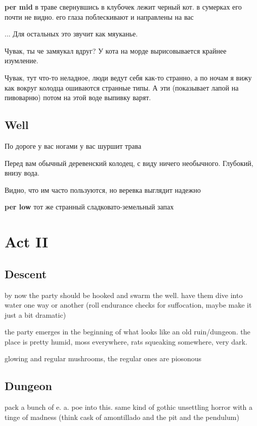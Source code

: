 \documentclass[a5paper,11pt]{book}
\begin{document}
\begin{multicols}{2}
\begin{boxed}
  \textbf{per mid} в траве свернувшись в клубочек лежит черный кот. в сумерках его почти не видно. его глаза поблескивают и направлены на вас

  ... Для остальных это звучит как мяуканье. 

  Чувак, ты че замяукал вдруг? У кота на морде вырисовывается крайнее изумление.

  Чувак, тут что-то неладное, люди ведут себя как-то странно, а по ночам я вижу как вокруг колодца ошиваются странные типы. А эти (показывает лапой на пивоварню) потом на этой воде выпивку варят.
\end{boxed}

\subsection{Well}
\begin{boxed}
  По дороге у вас ногами у вас шуршит трава

  Перед вам обычный деревенский колодец, с виду ничего необычного. Глубокий, внизу вода.

  Видно, что им часто пользуются, но веревка выглядит надежно

  \textbf{per low} тот же странный сладковато-земельный запах
\end{boxed}

\section{Act II}
\subsection{Descent}
by now the party should be hooked and swarm the well. have them dive into water one way or another (roll endurance checks for suffocation, maybe make it just a bit dramatic)

the party emerges in the beginning of what looks like an old ruin/dungeon. the place is pretty humid, moss everywhere, rats squeaking somewhere, very dark.

glowing and regular mushrooms, the regular ones are piosonous

\subsection{Dungeon}
pack a bunch of e. a. poe into this. same kind of gothic unsettling horror with a tinge of madness (think cask of amontillado and the pit and the pendulum)


\end{multicols}
\end{document}
